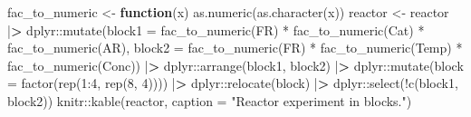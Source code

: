 \documentclass[
]{book}
\newenvironment{Shaded}{\begin{snugshade}}{\end{snugshade}}
\newcommand{\AttributeTok}[1]{\textcolor[rgb]{0.77,0.63,0.00}{#1}}
\newcommand{\ControlFlowTok}[1]{\textcolor[rgb]{0.13,0.29,0.53}{\textbf{#1}}}
\newcommand{\DecValTok}[1]{\textcolor[rgb]{0.00,0.00,0.81}{#1}}
\newcommand{\ErrorTok}[1]{\textcolor[rgb]{0.64,0.00,0.00}{\textbf{#1}}}
\newcommand{\FunctionTok}[1]{\textcolor[rgb]{0.00,0.00,0.00}{#1}}
\newcommand{\NormalTok}[1]{#1}
\newcommand{\OtherTok}[1]{\textcolor[rgb]{0.56,0.35,0.01}{#1}}
\newcommand{\SpecialCharTok}[1]{\textcolor[rgb]{0.00,0.00,0.00}{#1}}
\newcommand{\StringTok}[1]{\textcolor[rgb]{0.31,0.60,0.02}{#1}}
\theoremstyle{definition}
\theoremstyle{definition}
\theoremstyle{definition}
\theoremstyle{definition}
\theoremstyle{remark}
\begin{document}
\begin{Shaded}
\begin{Highlighting}[]
\NormalTok{fac\_to\_numeric }\OtherTok{\textless{}{-}} \ControlFlowTok{function}\NormalTok{(x) }\FunctionTok{as.numeric}\NormalTok{(}\FunctionTok{as.character}\NormalTok{(x))}
\NormalTok{reactor }\OtherTok{\textless{}{-}}\NormalTok{ reactor }\SpecialCharTok{|}\ErrorTok{\textgreater{}}\NormalTok{ dplyr}\SpecialCharTok{::}\FunctionTok{mutate}\NormalTok{(}\AttributeTok{block1 =} \FunctionTok{fac\_to\_numeric}\NormalTok{(FR) }\SpecialCharTok{*} \FunctionTok{fac\_to\_numeric}\NormalTok{(Cat) }\SpecialCharTok{*}
                           \FunctionTok{fac\_to\_numeric}\NormalTok{(AR), }
                         \AttributeTok{block2 =} \FunctionTok{fac\_to\_numeric}\NormalTok{(FR) }\SpecialCharTok{*} \FunctionTok{fac\_to\_numeric}\NormalTok{(Temp) }\SpecialCharTok{*} 
                           \FunctionTok{fac\_to\_numeric}\NormalTok{(Conc)) }\SpecialCharTok{|}\ErrorTok{\textgreater{}} 
\NormalTok{  dplyr}\SpecialCharTok{::}\FunctionTok{arrange}\NormalTok{(block1, block2) }\SpecialCharTok{|}\ErrorTok{\textgreater{}}
\NormalTok{  dplyr}\SpecialCharTok{::}\FunctionTok{mutate}\NormalTok{(}\AttributeTok{block =} \FunctionTok{factor}\NormalTok{(}\FunctionTok{rep}\NormalTok{(}\DecValTok{1}\SpecialCharTok{:}\DecValTok{4}\NormalTok{, }\FunctionTok{rep}\NormalTok{(}\DecValTok{8}\NormalTok{, }\DecValTok{4}\NormalTok{)))) }\SpecialCharTok{|}\ErrorTok{\textgreater{}}
\NormalTok{  dplyr}\SpecialCharTok{::}\FunctionTok{relocate}\NormalTok{(block) }\SpecialCharTok{|}\ErrorTok{\textgreater{}} 
\NormalTok{  dplyr}\SpecialCharTok{::}\FunctionTok{select}\NormalTok{(}\SpecialCharTok{!}\FunctionTok{c}\NormalTok{(block1, block2))}
\NormalTok{knitr}\SpecialCharTok{::}\FunctionTok{kable}\NormalTok{(reactor, }\AttributeTok{caption =} \StringTok{"Reactor experiment in blocks."}\NormalTok{)}
\end{Highlighting}
\end{Shaded}
\end{document}
